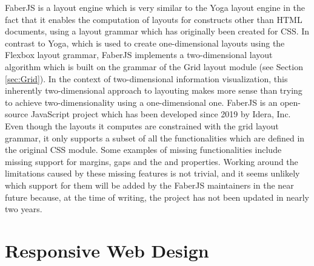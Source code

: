 FaberJS \parencite{FaberJS} is a layout engine which is very similar to the Yoga layout engine in the fact that it enables the computation of layouts for constructs other than HTML documents, using a layout grammar which has originally been created for CSS. 
In contrast to Yoga, which is used to create one-dimensional layouts using the Flexbox layout grammar, FaberJS implements a two-dimensional layout algorithm which is built on the grammar of the Grid layout module (see Section \ref{sec:Grid}). 
In the context of two-dimensional information visualization, this inherently two-dimensional approach to layouting makes more sense than trying to achieve two-dimensionality using a one-dimensional one. 
FaberJS is an open-source JavaScript project which has been developed since 2019 by Idera, Inc.
Even though the layouts it computes are constrained with the grid layout grammar, it only supports a subset of all the functionalities which are defined in the original CSS module. 
Some examples of missing functionalities include missing support for margins, gaps and the  and  properties. 
Working around the limitations caused by these missing features is not trivial, and it seems unlikely which support for them will be added by the FaberJS maintainers in the near future because, at the time of writing, the project has not been updated in nearly two years. 

\section{Responsive Web Design}
\label{sec:RWD}

